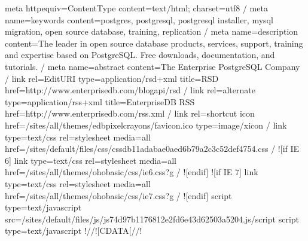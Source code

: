 \documentclass[letterpaper,10pt,english,openany,oneside]{sphinxmanual}
\begin{document}
\begin{sphinxVerbatim}[commandchars=\\\{\}]
    \PYGZlt{}meta http\PYGZhy{}equiv=\PYGZdq{}Content\PYGZhy{}Type\PYGZdq{} content=\PYGZdq{}text/html; charset=utf\PYGZhy{}8\PYGZdq{} /\PYGZgt{}
\PYGZlt{}meta name=\PYGZdq{}keywords\PYGZdq{} content=\PYGZdq{}postgres, postgresql, postgresql installer, mysql migration, open source database, training, replication\PYGZdq{} /\PYGZgt{}
\PYGZlt{}meta name=\PYGZdq{}description\PYGZdq{} content=\PYGZdq{}The leader in open source database products, services, support, training and expertise based on PostgreSQL. Free downloads, documentation, and tutorials.\PYGZdq{} /\PYGZgt{}
\PYGZlt{}meta name=\PYGZdq{}abstract\PYGZdq{} content=\PYGZdq{}The Enterprise PostgreSQL Company\PYGZdq{} /\PYGZgt{}
\PYGZlt{}link rel=\PYGZdq{}EditURI\PYGZdq{} type=\PYGZdq{}application/rsd+xml\PYGZdq{} title=\PYGZdq{}RSD\PYGZdq{} href=\PYGZdq{}http://www.enterprisedb.com/blogapi/rsd\PYGZdq{} /\PYGZgt{}
\PYGZlt{}link rel=\PYGZdq{}alternate\PYGZdq{} type=\PYGZdq{}application/rss+xml\PYGZdq{} title=\PYGZdq{}EnterpriseDB RSS\PYGZdq{} href=\PYGZdq{}http://www.enterprisedb.com/rss.xml\PYGZdq{} /\PYGZgt{}
\PYGZlt{}link rel=\PYGZdq{}shortcut icon\PYGZdq{} href=\PYGZdq{}/sites/all/themes/edb\PYGZus{}pixelcrayons/favicon.ico\PYGZdq{} type=\PYGZdq{}image/x\PYGZhy{}icon\PYGZdq{} /\PYGZgt{}
    \PYGZlt{}link type=\PYGZdq{}text/css\PYGZdq{} rel=\PYGZdq{}stylesheet\PYGZdq{} media=\PYGZdq{}all\PYGZdq{} href=\PYGZdq{}/sites/default/files/css/css\PYGZus{}db11adabae0aed6b79a2c3c52def4754.css\PYGZdq{} /\PYGZgt{}
\PYGZlt{}!\PYGZhy{}\PYGZhy{}[if IE 6]\PYGZgt{}
\PYGZlt{}link type=\PYGZdq{}text/css\PYGZdq{} rel=\PYGZdq{}stylesheet\PYGZdq{} media=\PYGZdq{}all\PYGZdq{} href=\PYGZdq{}/sites/all/themes/oho\PYGZus{}basic/css/ie6.css?g\PYGZdq{} /\PYGZgt{}
\PYGZlt{}![endif]\PYGZhy{}\PYGZhy{}\PYGZgt{}
\PYGZlt{}!\PYGZhy{}\PYGZhy{}[if IE 7]\PYGZgt{}
\PYGZlt{}link type=\PYGZdq{}text/css\PYGZdq{} rel=\PYGZdq{}stylesheet\PYGZdq{} media=\PYGZdq{}all\PYGZdq{} href=\PYGZdq{}/sites/all/themes/oho\PYGZus{}basic/css/ie7.css?g\PYGZdq{} /\PYGZgt{}
\PYGZlt{}![endif]\PYGZhy{}\PYGZhy{}\PYGZgt{}
    \PYGZlt{}script type=\PYGZdq{}text/javascript\PYGZdq{} src=\PYGZdq{}/sites/default/files/js/js\PYGZus{}74d97b1176812e2fd6e43d62503a5204.js\PYGZdq{}\PYGZgt{}\PYGZlt{}/script\PYGZgt{}
\PYGZlt{}script type=\PYGZdq{}text/javascript\PYGZdq{}\PYGZgt{}
\PYGZlt{}!\PYGZhy{}\PYGZhy{}//\PYGZhy{}\PYGZhy{}\PYGZgt{}\PYGZlt{}![CDATA[//\PYGZgt{}\PYGZlt{}!\PYGZhy{}\PYGZhy{}
\end{sphinxVerbatim}

\newpage
\end{document}
